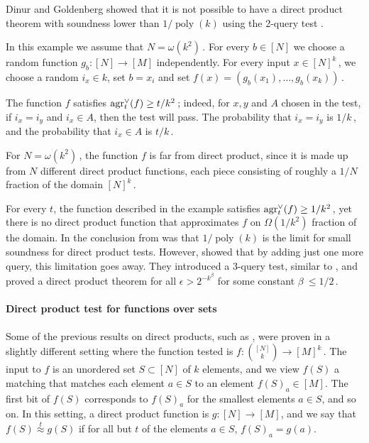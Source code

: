 \documentclass{toc}
\DeclareMathOperator{\poly}{poly} %
\newcommand\f{f} %
\newcommand\pf{g} %
\newcommand{\test}[2]{
	\ifx &#2&
	\textrm{agr}^{#1}
	\else	
	\textrm{agr}^{#1}_{#2}
	\fi}
\newcommand\neql[1]{\stackrel{{#1}}{ \approx}} %
\begin{document}
Dinur and Goldenberg showed that it is not possible to have a direct product theorem with soundness lower than 
%
$1/\poly(k)$ %
 using the 2-query test \cite{dinur2008locally}.
\begin{example}\label{ex:mult DP func}
In this example we %
%
%
%
%
%
%
assume that $N =\omega(k^2)$\,. %
For every $b\in [N]$ we choose a random function $\pf_b:[N]\rightarrow[M]$ independently. For every input $x\in[N]^k$\,, we choose a random $i_x\in k$, set $b=x_i$ and set $\f(x)= (\pf_{b}(x_1),\ldots,\pf_{b}(x_k) )$\,.
	
	The function $\f$ satisfies $\test{\vee}{t}(f) \geq 
t/k^2$\,; %
indeed, for $x,y$ and $A$ chosen in the test, if $i_x=i_y$ and $i_x\in A$, then the test will pass. The probability that $i_x=i_y$ is 
$1/k$\,, and the probability that $i_x\in A$ is $t/k$\,. %
	
%
For $N=\omega(k^2)$\,, the function $\f$ is %
far from direct product, since it 
is made up from $N$ different direct product
%
%
%
functions, each        
piece consisting of roughly
a  %
$1/N$ fraction of the domain $[N]^k$\,.
\end{example}
For every $t$, the function described in the example satisfies $\test{\vee}{t}(f)\geq
%
%
1/k^2$\,, %
yet there is no direct product function that approximates $f$ 
%
on $\Omega(1/k^2)$ fraction of the domain. %
In \cite{dinur2008locally} the conclusion from  was that $1/\poly(k)$ is the limit for small soundness for direct product tests. However, \cite{impagliazzo2012new} showed that by adding just one more query, this limitation goes away. They introduced a 3-query test, similar to , and proved a direct product theorem for all $\epsilon>2^{-k^\beta}$ for some constant $\beta\ \le 1/2$\,.

\paragraph*{Direct product test for functions over sets}
Some of the previous %
%
%
results on direct products,  %
such as \cite{impagliazzo2012new}, were proven in a slightly different setting where the function tested is $\f:\binom{[N]}{k}\rightarrow [M]^k$\,. The input to $\f$ is an unordered set $S\subset [N]$ of $k$ elements, and we view $\f(S)$ a matching that matches each element $a\in S$ to an element $f(S)_a\in [M]$.
%
%
The first bit of $f(S)$ corresponds to $f(S)_a$ for the smallest elements $a\in S$, and so on. %
In this setting, a direct product function is $\pf:[N]\rightarrow [M]$, and we say that $\f(S)\neql{t}\pf(S)$ if for all
%
but  %
$t$ of the elements $a\in S$, $\f(S)_a = \pf(a)$.
\end{document}
